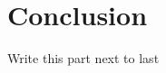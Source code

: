 \documentclass[preprint,12pt, a4paper]{elsarticle}
\begin{document}


\section{Conclusion}
\label{sec:conclusion}

Write this part next to last

\end{document}
